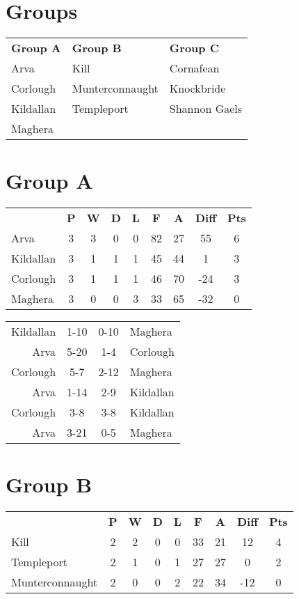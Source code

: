 \documentclass[11pt,a4paper]{article}
\begin{document}
\section*{Groups}

\begin{tabular}{lll}
\textbf{Group A} & \textbf{Group B} & \textbf{Group C} \\
Arva & Kill & Cornafean \\
Corlough & Munterconnaught & Knockbride \\
Kildallan & Templeport & Shannon Gaels \\
Maghera & & \\
\end{tabular}

\section*{Group A}

\begin{tabular}{lcccccccc}
 & \textbf{P} & \textbf{W} & \textbf{D} & \textbf{L} & \textbf{F} & \textbf{A} & \textbf{Diff} & \textbf{Pts} \\
Arva & 3 & 3 & 0 & 0 & 82 & 27 & 55 & 6 \\
Kildallan & 3 & 1 & 1 & 1 & 45 & 44 & 1 & 3 \\
Corlough & 3 & 1 & 1 & 1 & 46 & 70 & -24 & 3 \\
Maghera & 3 & 0 & 0 & 3 & 33 & 65 & -32 & 0\\
\end{tabular}

\vspace{10 mm}

\begin{tabular}{rccl}
Kildallan & 1-10 & 0-10 & Maghera \\
Arva & 5-20 & 1-4 & Corlough \\
Corlough & 5-7 & 2-12 & Maghera \\
Arva & 1-14 & 2-9 & Kildallan \\
Corlough & 3-8 & 3-8 & Kildallan \\
Arva & 3-21 & 0-5 & Maghera
\end{tabular}

\section*{Group B}

\begin{tabular}{lcccccccc}
 & \textbf{P} & \textbf{W} & \textbf{D} & \textbf{L} & \textbf{F} & \textbf{A} & \textbf{Diff} & \textbf{Pts} \\
Kill & 2 & 2 & 0 & 0 & 33 & 21 & 12 & 4 \\
Templeport & 2 & 1 & 0 & 1 & 27 & 27 & 0 & 2 \\
Munterconnaught & 2 & 0 & 0 & 2 & 22 & 34 & -12 & 0 \\
\end{tabular}
\end{document}
